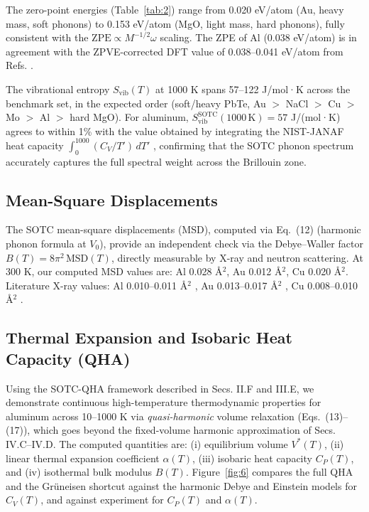 \documentclass[aps,prb,reprint,amsmath,amssymb,floatfix]{revtex4-2}
\begin{document}
The zero-point energies (Table~\ref{tab:2}) range from 0.020 eV/atom (Au, heavy
mass, soft phonons) to 0.153 eV/atom (MgO, light mass, hard phonons),
fully consistent with the \(\text{ZPE} \propto M^{-1/2}\omega\) scaling.
The ZPE of Al (0.038 eV/atom) is in agreement with the ZPVE-corrected
DFT value of 0.038--0.041 eV/atom from Refs. \cite{ref22,ref23}.

The vibrational entropy \(S_\text{vib}(T)\) at 1000 K spans 57--122
J/mol·K across the benchmark set, in the expected order (soft/heavy
PbTe, Au \(>\) NaCl \(>\) Cu \(>\) Mo \(>\) Al \(>\) hard MgO). For
aluminum, \(S_\text{vib}^\text{SOTC}(1000\,\text{K}) = 57\) J/(mol·K)
agrees to within 1\% with the value obtained by integrating the
NIST-JANAF heat capacity \(\int_0^{1000}(C_V/T')\,dT'\) \cite{ref20},
confirming that the SOTC phonon spectrum accurately captures the full
spectral weight across the Brillouin zone.

\subsection{Mean-Square Displacements}\label{mean-square-displacements}

The SOTC mean-square displacements (MSD), computed via Eq.~(12)
(harmonic phonon formula at \(V_0\)), provide an independent check via the
Debye--Waller factor \(B(T) = 8\pi^2\,\text{MSD}(T)\), directly
measurable by X-ray and neutron scattering. At 300 K, our computed MSD
values are: Al 0.028 Å\(^2\), Au 0.012 Å\(^2\), Cu 0.020 Å\(^2\).
Literature X-ray values: Al 0.010--0.011 Å\(^2\) \cite{ref36}, Au
0.013--0.017 Å\(^2\) \cite{ref37}, Cu 0.008--0.010 Å\(^2\) \cite{ref38}.

\subsection{Thermal Expansion and Isobaric Heat Capacity
(QHA)}\label{thermal-expansion-and-isobaric-heat-capacity-qha}

Using the SOTC-QHA framework described in Secs. II.F and III.E, we
demonstrate continuous high-temperature thermodynamic properties for
aluminum across 10--1000 K via \emph{quasi-harmonic} volume relaxation
(Eqs.~(13)--(17)), which goes beyond the fixed-volume harmonic
approximation of Secs. IV.C--IV.D. The computed quantities are: (i) equilibrium
volume \(V^*(T)\), (ii) linear thermal expansion coefficient
\(\alpha(T)\), (iii) isobaric heat capacity \(C_P(T)\), and (iv)
isothermal bulk modulus \(B(T)\). Figure~\ref{fig:6} compares the full
QHA and the Grüneisen shortcut against the harmonic Debye and Einstein
models for \(C_V(T)\), and against experiment for \(C_P(T)\) and
\(\alpha(T)\).
\end{document}

